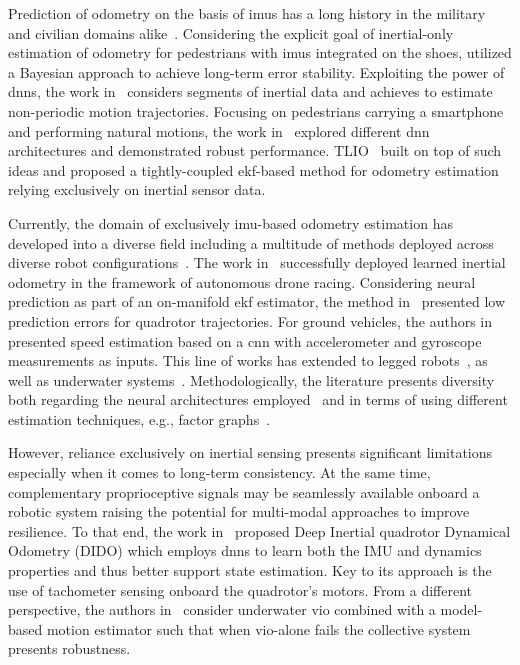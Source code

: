 Prediction of odometry on the basis of \acp{imu} has a long history in the military and civilian domains alike~\cite{titterton2004strapdown}. Considering the explicit goal of inertial-only estimation of odometry for pedestrians with \acp{imu} integrated on the shoes, \cite{angermann2012footslam} utilized a Bayesian approach to achieve long-term error stability. Exploiting the power of \acp{dnn}, the work in~\cite{ionet} considers segments of inertial data and achieves to estimate non-periodic motion trajectories. Focusing on pedestrians carrying a smartphone and performing natural motions, the work in~\cite{ronin} explored different \ac{dnn} architectures and demonstrated robust performance. TLIO~\cite{liuTLIOTightLearned2020a} built on top of such ideas and proposed a tightly-coupled \ac{ekf}-based method for odometry estimation relying exclusively on inertial sensor data. 

Currently, the domain of exclusively \ac{imu}-based odometry estimation has developed into a diverse field including a multitude of methods deployed across diverse robot configurations~\cite{cohen2023inertial}. The work in~\cite{cioffiLearnedInertialOdometry2023a} successfully deployed learned inertial odometry in the framework of autonomous drone racing. Considering neural prediction as part of an on-manifold \ac{ekf} estimator, the method in~\cite{bajwa2024dive} presented low prediction errors for quadrotor trajectories. For ground vehicles, the authors in~\cite{karlsson2021speed} presented speed estimation based on a \ac{cnn} with accelerometer and gyroscope measurements as inputs. This line of works has extended to legged robots~\cite{buchananLearningInertialOdometry2022}, as well as underwater systems~\cite{liDIEMEDeepInertial2024}. Methodologically, the literature presents diversity both regarding the neural architectures employed~\cite{chen2024deep} and in terms of using different estimation techniques, e.g., factor graphs~\cite{buchananDeepIMUBias2023a}. 

However, reliance exclusively on inertial sensing presents significant limitations especially when it comes to long-term consistency. At the same time, complementary proprioceptive signals may be seamlessly available onboard a robotic system raising the potential for multi-modal approaches to improve resilience. To that end, the work in~\cite{zhangDIDODeepInertial2022} proposed Deep Inertial quadrotor Dynamical Odometry (DIDO) which employs \acp{dnn} to learn both the IMU and dynamics properties and thus better support state estimation. Key to its approach is the use of tachometer sensing onboard the quadrotor's motors. From a different perspective, the authors in~\cite{joshiSMVIORobust2023a} consider underwater \ac{vio} combined with a model-based motion estimator such that when \ac{vio}-alone fails the collective system presents robustness. 

